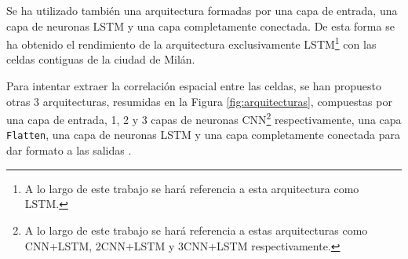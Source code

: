 Se ha utilizado también una arquitectura formadas por una capa de entrada, una capa de neuronas LSTM y una capa completamente conectada. De esta forma se ha obtenido el rendimiento de la arquitectura exclusivamente LSTM\footnote{A lo largo de este trabajo se hará referencia a esta arquitectura como LSTM.} con las celdas contiguas de la ciudad de Milán.

Para intentar extraer la correlación espacial entre las celdas, se han propuesto otras 3 arquitecturas, resumidas en la Figura \ref{fig:arquitecturas}, compuestas por una capa de entrada, 1, 2 y 3 capas de neuronas CNN\footnote{A lo largo de este trabajo se hará referencia a estas arquitecturas como CNN+LSTM, 2CNN+LSTM y 3CNN+LSTM respectivamente.} respectivamente, una capa \texttt{Flatten}, una capa de neuronas LSTM y una capa completamente conectada para dar formato a las salidas \cite{timedistributed}.



